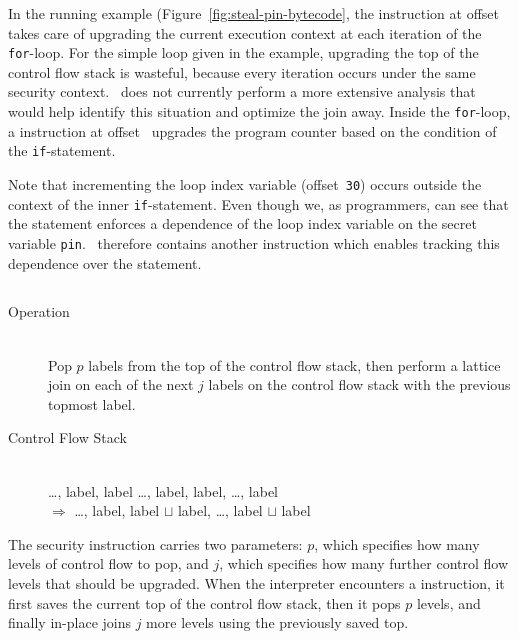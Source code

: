 In the running example (Figure~\ref{fig:steal-pin-bytecode}, the \join instruction at offset~ takes care of upgrading the current execution context at each iteration of the \texttt{for}-loop.
For the simple loop given in the example, upgrading the top of the control flow stack is wasteful, because every iteration occurs under the same security context.
\FlowCore\ does not currently perform a more extensive analysis that would help identify this situation and optimize the join away.
Inside the \texttt{for}-loop, a \join instruction at offset~ upgrades the program counter based on the condition of the \texttt{if}-statement.

Note that incrementing the loop index variable (offset~\texttt{30}) occurs outside the context of the inner \texttt{if}-statement.
Even though we, as programmers, can see that the  statement enforces a dependence of the loop index variable on the secret variable \texttt{pin}.
\FlowCore\ therefore contains another instruction which enables tracking this dependence over the  statement.

\subsection{\popj}

\begin{samepage}
\begin{description}
\item[Operation] \hfill \\
 Pop $p$ labels from the top of the control flow stack, then perform a lattice join on each of the next $j$ labels on the control flow stack with the previous topmost label.
\item[Control Flow Stack] \hfill \\
  \ldots, label, label \ldots, label, label, \ldots, label\\
 $\Rightarrow$
 \ldots, label, label $\sqcup$ label, \ldots, label $\sqcup$ label
\end{description}
\end{samepage}

The \popj security instruction carries two parameters: $p$, which specifies how many levels of control flow to pop, and $j$, which specifies how many further control flow levels that should be upgraded.
When the interpreter encounters a \popj instruction, it first saves the current top of the control flow stack, then it pops $p$ levels, and finally in-place joins $j$ more levels using the previously saved top.

